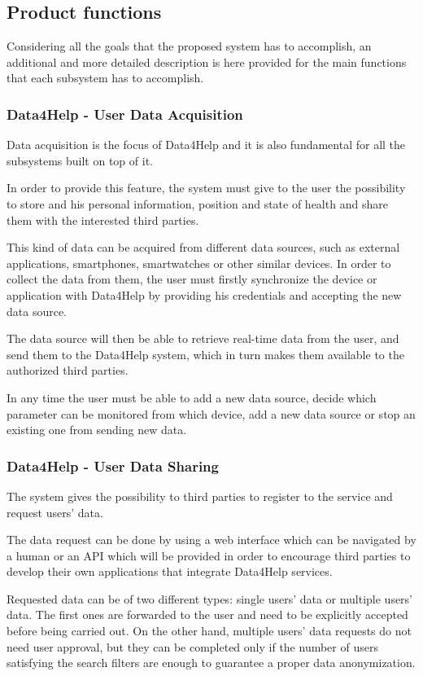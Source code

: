 \subsection{Product functions}
Considering all the goals that the proposed system has to accomplish, an additional and more detailed description is here provided for the main functions that each subsystem has to accomplish.

\subsubsection{Data4Help - User Data Acquisition}
Data acquisition is the focus of Data4Help and it is also fundamental for all the subsystems built on top of it.

In order to provide this feature, the system must give to the user the possibility to store and his personal information, position and state of health and share them with the interested third parties.
 
This kind of data can be acquired from different data sources, such as external applications, smartphones, smartwatches or other similar devices. In order to collect the data from them, the user must firstly synchronize the device or application with Data4Help by providing his credentials and accepting the new data source.

The data source will then be able to retrieve real-time data from the user, and send them to the Data4Help system, which in turn makes them available to the authorized third parties.

In any time the user must be able to add a new data source, decide which parameter can be monitored from which device, add a new data source or stop an existing one from sending new data.

\subsubsection{Data4Help - User Data Sharing}
The system gives the possibility to third parties to register to the service and request users' data.

The data request can be done by using a web interface which can be navigated by a human or an API which will be provided in order to encourage third parties to develop their own applications that integrate Data4Help services.

Requested data can be of two different types: single users' data or multiple users' data. The first ones are forwarded to the user and need to be explicitly accepted before being carried out. On the other hand, multiple users' data requests do not need user approval, but they can be completed only if the number of users satisfying the search filters are enough to guarantee a proper data anonymization.

